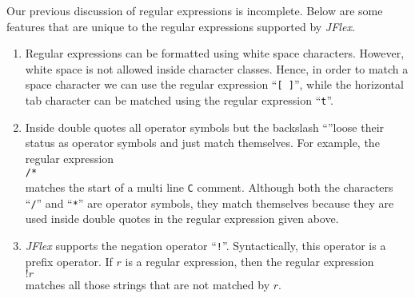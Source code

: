 Our previous discussion of regular expressions is incomplete.  Below are some features that are
unique to the regular expressions supported by \textsl{JFlex}.
\begin{enumerate}
\item Regular expressions can be formatted using white space characters.
      However, white space is not allowed inside character classes.
      Hence, in order to match a space character we can use the regular expression
      ``\texttt{[ ]}'', while the horizontal tab character can be matched using the regular
      expression ``\texttt{t}''.
\item Inside double quotes all operator symbols but the backslash ``\texttt{}''loose
      their status as operator symbols and just match themselves.  For example, the regular expression 
      \\[0.2cm]
      \hspace*{1.3cm}
      \texttt{/*}
      \\[0.2cm]
      matches the start of a multi line \texttt{C} comment.  Although both the characters
      ``\texttt{/}'' and ``\texttt{*}'' are operator symbols, they match themselves because they are
      used inside double quotes in the regular expression given above.
\item \textsl{JFlex} supports the negation operator ``\texttt{!}''.  Syntactically, this operator is a
      prefix operator.  If $r$ is a regular expression, then the regular expression
      \\[0.2cm]
      \hspace*{1.3cm}
      $\texttt{!}r$      
      \\[0.2cm]
      matches all those strings that are not matched by $r$.


\end{enumerate}

